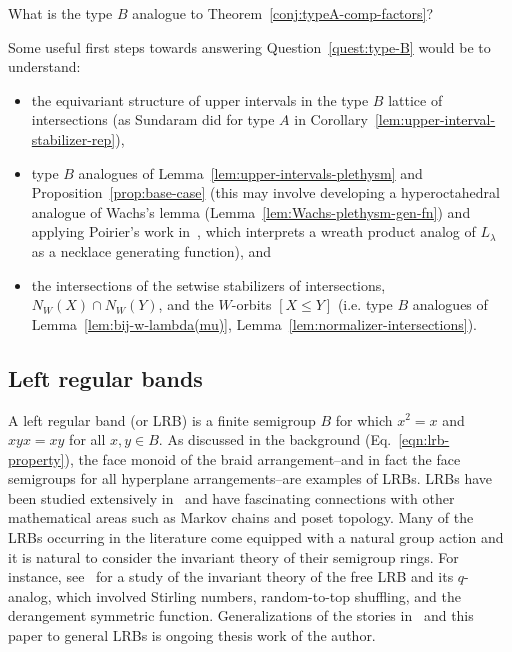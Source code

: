 \documentclass[ALCO, Unicode]{cedram}
\begin{document}
\begin{question}\label{quest:type-B}
    What is the type $B$ analogue to Theorem~\ref{conj:typeA-comp-factors}?
\end{question}

Some useful first steps towards answering Question~\ref{quest:type-B} would be to understand:
\begin{itemize}
    \item the equivariant structure of upper intervals in the type $B$ lattice of intersections (as Sundaram did for type $A$ in Corollary~\ref{lem:upper-interval-stabilizer-rep}),
    \item type $B$ analogues of Lemma~\ref{lem:upper-intervals-plethysm} and Proposition~\ref{prop:base-case} (this may involve developing a hyperoctahedral analogue of Wachs's lemma (Lemma~\ref{lem:Wachs-plethysm-gen-fn}) and applying Poirier's work in~\cite[Theorem 16]{Poirier}, which interprets a wreath product analog of $L_\lambda$ as a necklace generating function), and
    \item the intersections of the setwise stabilizers of intersections, $N_W(X) \cap N_W(Y)$, and the $W$-orbits $[X \leq Y]$ (i.e. type $B$ analogues of Lemma~\ref{lem:bij-w-lambda(mu)}, Lemma~\ref{lem:normalizer-intersections}).\end{itemize}



\subsection{Left regular bands} \label{sec:LRBs}A {left regular band (or LRB)} is a finite semigroup $B$ for which $x^2 = x$ and $xyx = xy$ for all $x, y \in B.$ As discussed in the background (Eq.~\eqref{eqn:lrb-property}), the face monoid of the braid arrangement--and in fact the face semigroups for all hyperplane arrangements--are examples of LRBs. LRBs  have been studied extensively in~\cite{aguiar2006coxeter, BrownonLRBs, margolis2015combinatorial, MSS, saliolaquiverlrb, SteinbergRepMonoidsBook} and have fascinating connections with other mathematical areas such as Markov chains and poset topology. Many of the LRBs occurring in the literature come equipped with a natural group action and it is natural to consider the invariant theory of their semigroup rings. For instance, see~\cite{BraunerComminsReiner} for a study of the invariant theory of the free LRB and its $q$-analog, which involved Stirling numbers, random-to-top shuffling, and the derangement symmetric function. Generalizations of the stories in~\cite{BraunerComminsReiner} and this paper to general LRBs is ongoing thesis work of the author.
\end{document}
